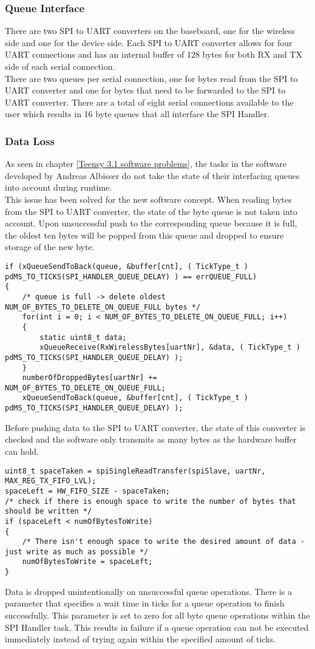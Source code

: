 \subsubsection{Queue Interface}
There are two SPI to UART converters on the baseboard, one for the wireless side and one for the device side. Each SPI to UART converter allows for four UART connections and has an internal buffer of 128 bytes for both RX and TX side of each serial connection.\\
There are two queues per serial connection, one for bytes read from the SPI to UART converter and one for bytes that need to be forwarded to the SPI to UART converter. There are a total of eight serial connections available to the user which results in 16 byte queues that all interface the SPI Handler.
\subsubsection{Data Loss}
As seen in chapter \ref{Teensy 3.1 software problems}, the tasks in the software developed by Andreas Albisser do not take the state of their interfacing queues into account during runtime.\\
This issue has been solved for the new software concept. When reading bytes from the SPI to UART converter, the state of the byte queue is not taken into account. Upon unsuccessful push to the corresponding queue because it is full, the oldest ten bytes will be popped from this queue and dropped to ensure storage of the new byte.\\
\begin{lstlisting}
if (xQueueSendToBack(queue, &buffer[cnt], ( TickType_t ) pdMS_TO_TICKS(SPI_HANDLER_QUEUE_DELAY) ) == errQUEUE_FULL)
{
    /* queue is full -> delete oldest NUM_OF_BYTES_TO_DELETE_ON_QUEUE_FULL bytes */
    for(int i = 0; i < NUM_OF_BYTES_TO_DELETE_ON_QUEUE_FULL; i++)
    {
        static uint8_t data;
        xQueueReceive(RxWirelessBytes[uartNr], &data, ( TickType_t ) pdMS_TO_TICKS(SPI_HANDLER_QUEUE_DELAY) );
    }
    numberOfDroppedBytes[uartNr] += NUM_OF_BYTES_TO_DELETE_ON_QUEUE_FULL;
    xQueueSendToBack(queue, &buffer[cnt], ( TickType_t ) pdMS_TO_TICKS(SPI_HANDLER_QUEUE_DELAY) );
\end{lstlisting}
Before pushing data to the SPI to UART converter, the state of this converter is checked and the software only transmits as many bytes as the hardware buffer can hold.
\begin{lstlisting}
uint8_t spaceTaken = spiSingleReadTransfer(spiSlave, uartNr, MAX_REG_TX_FIFO_LVL);
spaceLeft = HW_FIFO_SIZE - spaceTaken;
/* check if there is enough space to write the number of bytes that should be written */
if (spaceLeft < numOfBytesToWrite)
{
    /* There isn't enough space to write the desired amount of data - just write as much as possible */
    numOfBytesToWrite = spaceLeft;
}
\end{lstlisting}
Data is dropped unintentionally on unsuccessful queue operations. There is a parameter that specifies a wait time in ticks for a queue operation to finish successfully. This parameter is set to zero for all byte queue operations within the SPI Handler task. This results in failure if a queue operation can not be executed immediately instead of trying again within the specified amount of ticks.
